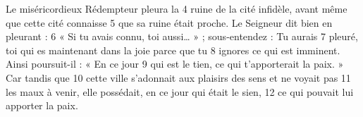 Le miséricordieux Rédempteur pleura la	 
4	 	ruine de la cité infidèle, avant même que cette cité connaisse	 
5	 	que sa ruine était proche. Le Seigneur dit bien en pleurant :	 
6	 	« Si tu avais connu, toi aussi… » ; sous-entendez : Tu aurais	 
7	 	pleuré, toi qui es maintenant dans la joie parce que tu	 
8	 	ignores ce qui est imminent. Ainsi poursuit-il : « En ce jour	 
9	 	qui est le tien, ce qui t'apporterait la paix. » Car tandis que	 
10	 	cette ville s'adonnait aux plaisirs des sens et ne voyait pas	 
11	 	les maux à venir, elle possédait, en ce jour qui était le sien,	 
12	 	ce qui pouvait lui apporter la paix.